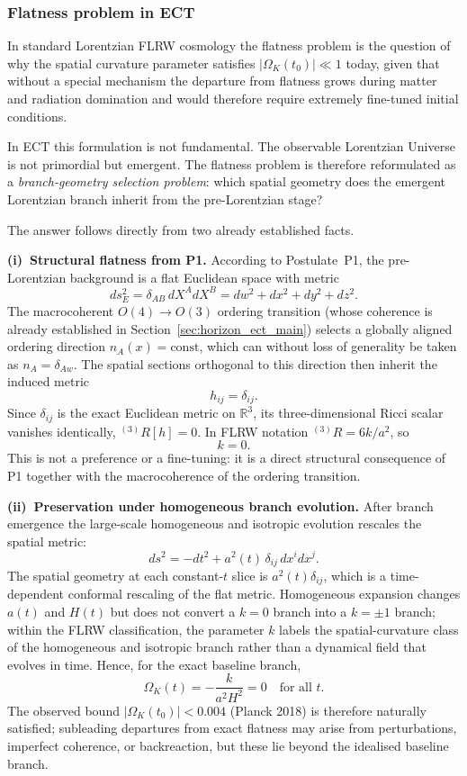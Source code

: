 \documentclass[11pt,a4paper]{article}
\numberwithin{equation}{section}
\begin{document}
\subsubsection*{Flatness problem in ECT}
\label{sec:flatness_ect}

In standard Lorentzian FLRW cosmology the flatness problem is the question
of why the spatial curvature parameter satisfies $|\Omega_K(t_0)|\ll 1$
today, given that without a special mechanism the departure from flatness
grows during matter and radiation domination and would therefore require
extremely fine-tuned initial conditions.

In ECT this formulation is not fundamental.
The observable Lorentzian Universe is not primordial but emergent.
The flatness problem is therefore reformulated as a
\emph{branch-geometry selection problem}: which spatial geometry does the
emergent Lorentzian branch inherit from the pre-Lorentzian stage?

The answer follows directly from two already established facts.

\textbf{(i)~Structural flatness from P1.}
According to Postulate~P1, the pre-Lorentzian background is a flat
Euclidean space with metric
\[
ds_E^2 = \delta_{AB}\,dX^A dX^B
= dw^2 + dx^2 + dy^2 + dz^2.
\]
The macrocoherent $O(4)\to O(3)$ ordering transition (whose coherence is
already established in Section~\ref{sec:horizon_ect_main}) selects a
globally aligned ordering direction $n_A(x)=\mathrm{const}$, which can
without loss of generality be taken as $n_A = \delta_{Aw}$.
The spatial sections orthogonal to this direction then inherit the
induced metric
\[
h_{ij} = \delta_{ij}.
\]
Since $\delta_{ij}$ is the exact Euclidean metric on $\mathbb{R}^3$, its
three-dimensional Ricci scalar vanishes identically,
${}^{(3)}R[h]=0$.
In FLRW notation ${}^{(3)}R = 6k/a^2$, so
\[
\boxed{k = 0.}
\]
This is not a preference or a fine-tuning: it is a direct structural
consequence of P1 together with the macrocoherence of the ordering
transition.

\textbf{(ii)~Preservation under homogeneous branch evolution.}
After branch emergence the large-scale homogeneous and isotropic
evolution rescales the spatial metric:
\[
ds^2 = -dt^2 + a^2(t)\,\delta_{ij}\,dx^i dx^j.
\]
The spatial geometry at each constant-$t$ slice is $a^2(t)\delta_{ij}$,
which is a time-dependent conformal rescaling of the flat metric.
Homogeneous expansion changes $a(t)$ and $H(t)$ but does not convert
a $k=0$ branch into a $k=\pm 1$ branch; within the FLRW classification,
the parameter $k$ labels the spatial-curvature class of the homogeneous
and isotropic branch rather than a dynamical field that evolves in time.
Hence, for the exact baseline branch,
\[
\Omega_K(t)
= -\frac{k}{a^2 H^2}
= 0
\quad \text{for all } t.
\]
The observed bound $|\Omega_K(t_0)| < 0.004$ (Planck 2018) is therefore
naturally satisfied; subleading departures from exact flatness may arise
from perturbations, imperfect coherence, or backreaction, but these lie
beyond the idealised baseline branch.
\end{document}
